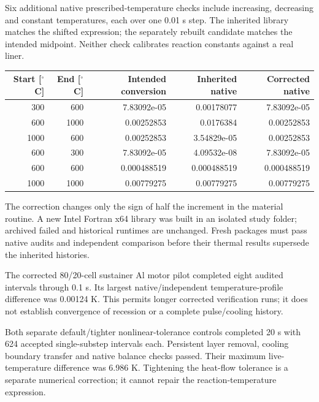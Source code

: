 \documentclass[oneside,openany]{amsdtx}
\begin{document}
Six additional native prescribed-temperature checks include increasing, decreasing and constant temperatures, each over one 0.01 s step. The inherited library matches the shifted expression; the separately rebuilt candidate matches the intended midpoint. Neither check calibrates reaction constants against a real liner.

\begin{table}[H]\centering\scriptsize\begin{tabular}{rrrrr}\toprule Start [$^\circ$C] & End [$^\circ$C] & Intended conversion & Inherited native & Corrected native\\\midrule

300 & 600 & 7.83092e-05 & 0.00178077 & 7.83092e-05 \\
600 & 1000 & 0.00252853 & 0.0176384 & 0.00252853 \\
1000 & 600 & 0.00252853 & 3.54829e-05 & 0.00252853 \\
600 & 300 & 7.83092e-05 & 4.09532e-08 & 7.83092e-05 \\
600 & 600 & 0.000488519 & 0.000488519 & 0.000488519 \\
1000 & 1000 & 0.00779275 & 0.00779275 & 0.00779275 \\

\bottomrule\end{tabular}\end{table}

The correction changes only the sign of half the increment in the material routine. A new Intel Fortran x64 library was built in an isolated study folder; archived failed and historical runtimes are unchanged. Fresh packages must pass native audits and independent comparison before their thermal results supersede the inherited histories.

The corrected 80/20-cell sustainer Al motor pilot completed eight audited intervals through 0.1 s. Its largest native/independent temperature-profile difference was 0.00124 K. This permits longer corrected verification runs; it does not establish convergence of recession or a complete pulse/cooling history.

Both separate default/tighter nonlinear-tolerance controls completed 20 s with 624 accepted single-substep intervals each. Persistent layer removal, cooling boundary transfer and native balance checks passed. Their maximum live-temperature difference was 6.986 K. Tightening the heat-flow tolerance is a separate numerical correction; it cannot repair the reaction-temperature expression.
\end{document}
